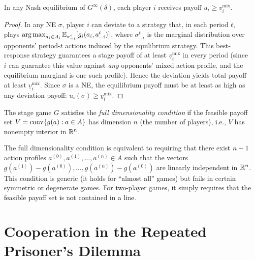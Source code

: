 \documentclass[11pt,a4paper]{article}
\begin{document}
\begin{proposition}
\label{prop:ne-payoff-lower-bound}
In any Nash equilibrium of $G^\infty(\delta)$, each player $i$ receives
payoff $u_i \geq \underline{v}_i^{\mathrm{mix}}$.
\end{proposition}

\begin{proof}
In any NE $\sigma$, player $i$ can deviate to a strategy that, in each
period $t$, plays
$\operatorname{arg\,max}_{a_i \in A_i} \mathbb{E}_{\sigma_{-i}^t}[g_i(a_i, a_{-i}^t)]$, where
$\sigma_{-i}^t$ is the marginal distribution over opponents' period-$t$
actions induced by the equilibrium strategy. This best-response strategy
guarantees a stage payoff of at least $\underline{v}_i^{\mathrm{mix}}$ in
every period (since $i$ can guarantee this value against \emph{any}
opponents' mixed action profile, and the equilibrium marginal is one such
profile). Hence the deviation yields total payoff at least
$\underline{v}_i^{\mathrm{mix}}$. Since $\sigma$ is a NE, the equilibrium
payoff must be at least as high as any deviation payoff:
$u_i(\sigma) \geq \underline{v}_i^{\mathrm{mix}}$.
\end{proof}

\begin{definition}
\label{def:full-dim}
The stage game $G$ satisfies the \emph{full dimensionality condition} if the
feasible payoff set $V = \operatorname{conv}\{g(a) : a \in A\}$ has dimension $n$ (the
number of players), i.e., $V$ has nonempty interior in $\mathbb{R}^n$.
\end{definition}

\begin{remark}
The full dimensionality condition is equivalent to requiring that there
exist $n+1$ action profiles $a^{(0)}, a^{(1)}, \ldots, a^{(n)} \in A$
such that the vectors $g(a^{(1)}) - g(a^{(0)}), \ldots,
g(a^{(n)}) - g(a^{(0)})$ are linearly independent in $\mathbb{R}^n$. This
condition is generic (it holds for ``almost all'' games) but fails in
certain symmetric or degenerate games. For two-player games, it simply
requires that the feasible payoff set is not contained in a line.
\end{remark}


\section{Cooperation in the Repeated Prisoner's Dilemma}
\label{sec:cooperation-pd}
\end{document}
